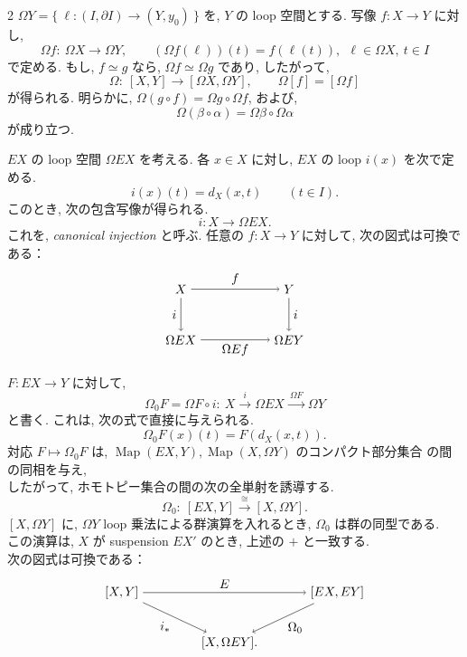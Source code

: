 \documentclass[10pt, leqno]{ltjsarticle}
\newcommand{\Ox}{\Omega}   %
\newcommand{\map}{\operatorname{Map}}
\numberwithin{equation}{section}
\theoremstyle{plain}
\theoremstyle{definition}
\theoremstyle{remark}
\begin{document}
\begin{paracol}{2}
$\Ox Y=\{\ \ell:(I,\partial I)\to (Y,y_0)\ \}$ を, 
$Y$ の loop 空間とする. 写像 $f:X\to Y$ に対し,
\[
\Ox f:\ \Ox X\longrightarrow \Ox Y,\qquad
(\Ox f(\ell))(t)=f(\ell(t)),\ \ \ell\in\Ox X,\ t\in I
\]
で定める. もし, $f\simeq g$ なら, $\Ox f\simeq \Ox g$ であり, したがって,
\[
\Ox:\ [X,Y]\longrightarrow [\Ox X,\Ox Y],\qquad
\Omega [f] = [\Ox f]
\]
が得られる. 明らかに, 
$\Ox(g\circ f)=\Ox g\circ \Ox f$, および,
\[
\Ox(\beta\circ\alpha)=\Ox\beta\circ \Ox\alpha
\]
が成り立つ. 

$EX$ の loop 空間 $\Ox EX$ を考える. 各 $x\in X$ に対し,
\(EX\) の loop \(i(x)\) を次で定める.
\[
i(x)(t) = d_X(x,t)\qquad (t\in I).
\]
このとき, 次の包含写像が得られる.
\[
i:X\to \Ox EX.
\]
これを, \emph{canonical injection} と呼ぶ. 
任意の $f:X\to Y$ に対して, 次の図式は可換である：
\begin{equation}\label{eq:loop-susp-comm}
\begin{tikzpicture}[baseline=(current bounding box.center)]
\node (X) at (0,0) {$X$};
\node (Y) at (3,0) {$Y$};
\node (OX) at (0,-1.4) {$\Ox EX$};
\node (OY) at (3,-1.4) {$\Ox EY$};
\draw[->] (X)--node[above] {$f$} (Y);
\draw[->] (X)--node[left] {$i$} (OX);
\draw[->] (Y)--node[right] {$i$} (OY);
\draw[->] (OX)--node[below] {$\Ox Ef$} (OY);
\end{tikzpicture}
\end{equation}

$F:EX\to Y$ に対して,
\[
\Omega_0F=
\Ox F\circ i:\ X\xrightarrow{\ i\ }\Ox EX\xrightarrow{\ \Ox F\ }\Ox Y
\]
と書く. これは, 次の式で直接に与えられる.
\[
\Omega_0F(x)(t) = F(d_X(x,t)).
\]
対応 $F\longmapsto \Omega_0F$ は,
$\map(EX,Y), \map(X,\Omega Y)$ のコンパクト部分集合
の間の同相を与え, \\
したがって, ホモトピー集合の間の次の全単射を誘導する.
\begin{equation}
\Omega_0:\ [EX,Y]\xrightarrow{\ \cong\ }[X, \Ox Y].
\end{equation}
$[X,\Ox Y]$ に, \(\Omega Y\) loop 乗法による群演算を入れるとき, 
\(\Omega_0\) は群の同型である.\\
この演算は, $X$ が suspension $EX'$ のとき, 
上述の $+$ と一致する. \\
次の図式は可換である：
\begin{equation}
\begin{tikzpicture}[baseline=(current bounding box.center)]
\node (PX) at (-3,0) {$[X, Y]$};
\node (P1) at (3,0) {$[EX, EY]$};
\node (P2) at (0,-1.4) {$[X, \Ox EY].$};
\draw[->] (PX)--node[above] {$E$} (P1);
\draw[->] (PX)--node[below left] {$i_*$} (P2);
\draw[->] (P1)--node[below right] {$\Omega_0$} (P2);
\end{tikzpicture}
\end{equation}


\end{paracol}
\end{document}
